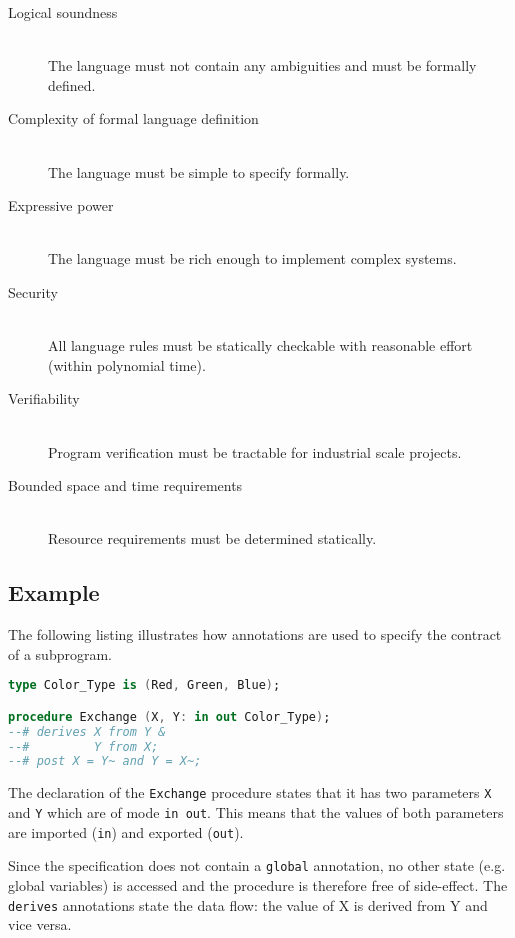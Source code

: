 \begin{description}
	\item[Logical soundness] \hfill \\
		The language must not contain any ambiguities and must be formally
		defined.
	\item[Complexity of formal language definition] \hfill \\
		The language must be simple to specify formally.
	\item[Expressive power] \hfill \\
		The language must be rich enough to implement complex systems.
	\item[Security] \hfill \\
		All language rules must be statically checkable with reasonable effort
		(within polynomial time).
	\item[Verifiability] \hfill \\
		Program verification must be tractable for industrial scale projects.
	\item[Bounded space and time requirements] \hfill \\
		Resource requirements must be determined statically.
\end{description}

\subsection{Example}
The following listing illustrates how annotations are used to specify the
contract of a subprogram.

\begin{lstlisting}[language=Ada]
type Color_Type is (Red, Green, Blue);

procedure Exchange (X, Y: in out Color_Type);
--# derives X from Y &
--#         Y from X;
--# post X = Y~ and Y = X~;
\end{lstlisting}

The declaration of the \texttt{Exchange} procedure states that it has two
parameters \texttt{X} and \texttt{Y} which are of mode \texttt{in out}. This
means that the values of both parameters are imported (\texttt{in}) and exported
(\texttt{out}).

Since the specification does not contain a \texttt{global} annotation, no other
state (e.g. global variables) is accessed and the procedure is therefore free of
side-effect. The \texttt{derives} annotations state the data flow: the value of
X is derived from Y and vice versa.

